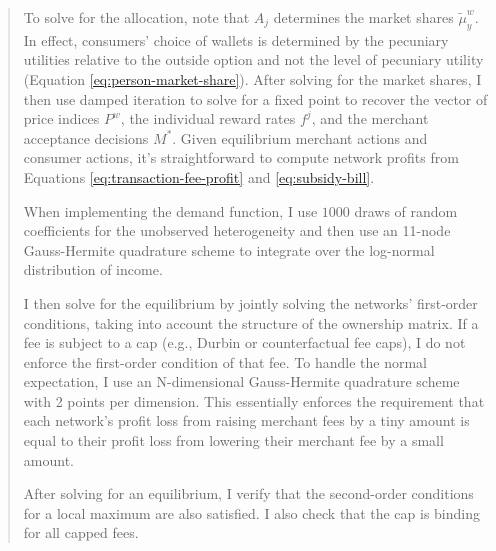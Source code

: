 \documentclass[main.tex]{subfiles}
\begin{document}
\begin{refsection}
\begin{quotation}
    To solve for the allocation, note that $A_j$ determines the market shares $\tilde{\mu}_y^w$.
In effect, consumers' choice of wallets is determined by the pecuniary utilities relative to the outside option and not the level of pecuniary utility (Equation \ref{eq:person-market-share}).
After solving for the market shares, I then use damped iteration to solve for a fixed point to recover the vector of price indices $P^w$, the individual reward rates $f^j$, and the merchant acceptance decisions $M^*$.
Given equilibrium merchant actions and consumer actions, it's straightforward to compute network profits from Equations \ref{eq:transaction-fee-profit} and \ref{eq:subsidy-bill}.

    When implementing the demand function, I use $1000$ draws of random coefficients for the unobserved heterogeneity and then use an 11-node Gauss-Hermite quadrature scheme to integrate over the log-normal distribution of income.

    I then solve for the equilibrium by jointly solving the networks' first-order conditions, taking into account the structure of the ownership matrix.
If a fee is subject to a cap (e.g., Durbin or counterfactual fee caps), I do not enforce the first-order condition of that fee.
To handle the normal expectation, I use an N-dimensional Gauss-Hermite quadrature scheme with 2 points per dimension.
This essentially enforces the requirement that each network's profit loss from raising merchant fees by a tiny amount is equal to their profit loss from lowering their merchant fee by a small amount.

    After solving for an equilibrium, I verify that the second-order conditions for a local maximum are also satisfied.
I also check that the cap is binding for all capped fees.
\end{quotation}


\end{refsection}
\end{document}
